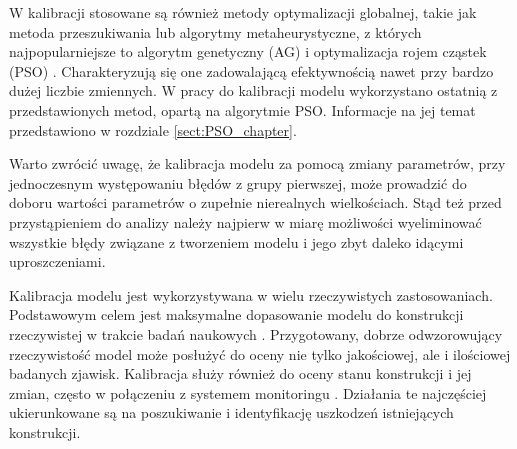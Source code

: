 W kalibracji stosowane są również metody optymalizacji globalnej, takie jak metoda przeszukiwania lub algorytmy metaheurystyczne, z których najpopularniejsze to algorytm genetyczny (AG) i optymalizacja rojem cząstek (PSO) \parencite{Boulkaibet2015,Tran-Ngoc2018,Dan2015,Qin2018}. Charakteryzują się one zadowalającą efektywnością nawet przy bardzo dużej liczbie zmiennych. W pracy do kalibracji modelu wykorzystano ostatnią z przedstawionych metod, opartą na algorytmie PSO. Informacje na jej temat przedstawiono w rozdziale \ref{sect:PSO_chapter}.

Warto zwrócić uwagę, że kalibracja modelu za pomocą zmiany parametrów, przy jednoczesnym występowaniu błędów z grupy pierwszej, może prowadzić do doboru wartości parametrów o zupełnie nierealnych wielkościach. Stąd też przed przystąpieniem do analizy należy najpierw w miarę możliwości wyeliminować wszystkie błędy związane z tworzeniem modelu i jego zbyt daleko idącymi uproszczeniami.

Kalibracja modelu jest wykorzystywana w wielu rzeczywistych zastosowaniach. Podstawowym celem jest maksymalne dopasowanie modelu do konstrukcji rzeczywistej w trakcie badań naukowych \parencite{Li2020,Brownjohn2001,Zhang2019,Kuzawa2012,Petersen2017,Poprawa2017}. Przygotowany, dobrze odwzorowujący rzeczywistość model może posłużyć do oceny nie tylko jakościowej, ale i ilościowej badanych zjawisk. Kalibracja służy również do oceny stanu konstrukcji i jej zmian, często w połączeniu z systemem monitoringu \parencite{Brownjohn2000,Brownjohn2003,Zoltowski2020}. Działania te najczęściej ukierunkowane są na poszukiwanie i identyfikację uszkodzeń istniejących konstrukcji.



